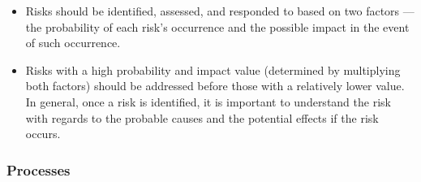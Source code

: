 \documentclass[letterpaper,10pt,english]{jupyterBook}
\begin{document}
\begin{itemize}
\begin{itemize}
\item {} 
\sphinxAtStartPar
Risks should be identified, assessed, and responded to based on two factors — the probability of each risk’s occurrence and the possible impact in the event of such occurrence.

\item {} 
\sphinxAtStartPar
Risks with a high probability and impact value (determined by multiplying both factors) should be addressed before those with a relatively lower value. In general, once a risk is identified, it is important to understand the risk with regards to the probable causes and the potential effects if the risk occurs.

\end{itemize}

\end{itemize}


\subsubsection{Processes}
\label{\detokenize{APM/sbok:processes}}
\end{document}

